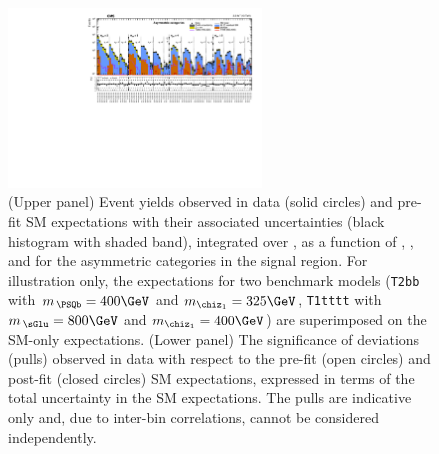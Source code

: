 \begin{figure}[!h]
  \begin{center}
    \includegraphics[angle=90,width=0.6\textwidth]{figures/result/v3/summaryPlot_Asymmetric_prefit_overlay_fit_b}
    \caption{(Upper panel) Event yields observed in data (solid circles)
      and pre-fit SM expectations with their associated
      uncertainties (black histogram with shaded band), integrated
      over \HTmiss, as a function of \njet, \nb, and \scalht for the
      asymmetric \njet categories in the signal region. For
      illustration only, the expectations for two benchmark models
      (\texttt{T2bb} with $m_{\,\PSQb} = 400\GeV$ and $m_{\chiz_1} =
      325\GeV$, \texttt{T1tttt} with $m_{\,\sGlu} = 800\GeV$ and
      $m_{\chiz_1} = 400\GeV$) are superimposed on the SM-only
      expectations. (Lower panel) The significance of deviations
      (pulls) observed in data with respect to the pre-fit (open
      circles) and post-fit (closed circles) SM expectations,
      expressed in terms of the total uncertainty in the SM
      expectations. The pulls are indicative only and, due to
      inter-bin correlations, cannot be considered independently.} 
    \label{fig:asym}
  \end{center}
\end{figure}

